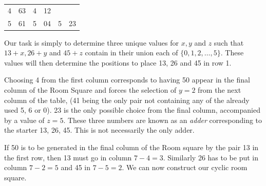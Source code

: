 \documentclass[
  11pt,
  a4paper]{book}
\begin{document}
\begin{longtable}[]{@{}llllll@{}}
\begin{minipage}[t]{0.05\columnwidth}
4\strut
\end{minipage} & \begin{minipage}[t]{0.10\columnwidth}\raggedright
63\strut
\end{minipage} & \begin{minipage}[t]{0.05\columnwidth}\raggedright
4\strut
\end{minipage} & \begin{minipage}[t]{0.10\columnwidth}\raggedright
12\strut
\end{minipage}\tabularnewline
\begin{minipage}[t]{0.05\columnwidth}\raggedright
5\strut
\end{minipage} & \begin{minipage}[t]{0.10\columnwidth}\raggedright
61\strut
\end{minipage} & \begin{minipage}[t]{0.05\columnwidth}\raggedright
5\strut
\end{minipage} & \begin{minipage}[t]{0.10\columnwidth}\raggedright
04\strut
\end{minipage} & \begin{minipage}[t]{0.05\columnwidth}\raggedright
5\strut
\end{minipage} & \begin{minipage}[t]{0.10\columnwidth}\raggedright
23\strut
\end{minipage}\tabularnewline
\bottomrule
\end{longtable}

Our task is simply to determine three unique values for \(x, y\) and \(z\) such that \(13 + x, 26 + y\) and \(45 + z\) contain
in their union each of \(\{0, 1, 2, \ldots, 5\}\). These
values will then determine the positions to place 13, 26 and
45 in row 1.

Choosing 4 from the first column corresponds to having 50
appear in the final column of the Room Square and forces the
selection of \(y = 2\) from the next column of the table, (41
being the only pair not containing any of the already used
5, 6 or 0). 23 is the only possible choice from the final
column, accompanied by a value of \(z = 5\). These three
numbers are known as an \emph{adder} corresponding to the starter
13, 26, 45. This is not necessarily the only adder.

If 50 is to be generated in the final column of the Room
square by the pair 13 in the first row, then 13 must go in
column \(7 - 4 = 3\). Similarly 26 has to be put in column
\(7 - 2 = 5\) and 45 in \(7 - 5 = 2\). We can now construct our
cyclic room square.
\end{document}
